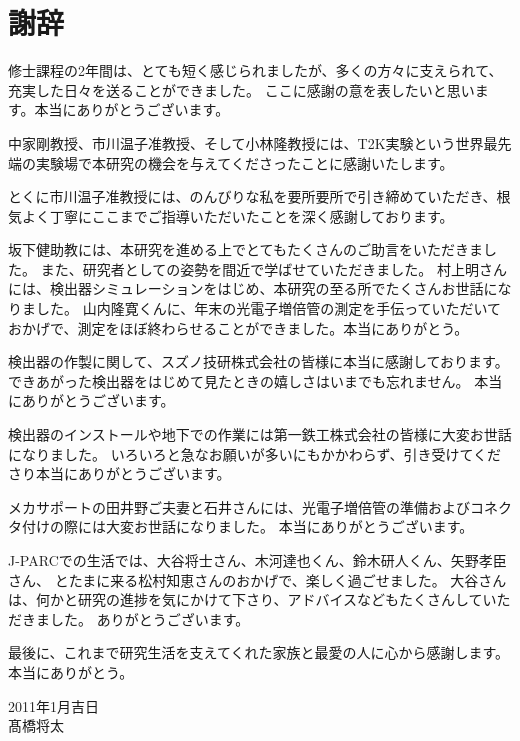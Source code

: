 \chapter*{謝辞}

修士課程の2年間は、とても短く感じられましたが、多くの方々に支えられて、充実した日々を送ることができました。
ここに感謝の意を表したいと思います。本当にありがとうございます。

中家剛教授、市川温子准教授、そして小林隆教授には、T2K実験という世界最先端の実験場で本研究の機会を与えてくださったことに感謝いたします。

とくに市川温子准教授には、のんびりな私を要所要所で引き締めていただき、根気よく丁寧にここまでご指導いただいたことを深く感謝しております。

坂下健助教には、本研究を進める上でとてもたくさんのご助言をいただきました。
また、研究者としての姿勢を間近で学ばせていただきました。
村上明さんには、検出器シミュレーションをはじめ、本研究の至る所でたくさんお世話になりました。
山内隆寛くんに、年末の光電子増倍管の測定を手伝っていただいておかげで、測定をほぼ終わらせることができました。本当にありがとう。

検出器の作製に関して、スズノ技研株式会社の皆様に本当に感謝しております。
できあがった検出器をはじめて見たときの嬉しさはいまでも忘れません。
本当にありがとうございます。

検出器のインストールや地下での作業には第一鉄工株式会社の皆様に大変お世話になりました。
いろいろと急なお願いが多いにもかかわらず、引き受けてくださり本当にありがとうございます。

メカサポートの田井野ご夫妻と石井さんには、光電子増倍管の準備およびコネクタ付けの際には大変お世話になりました。
本当にありがとうございます。


J-PARCでの生活では、大谷将士さん、木河達也くん、鈴木研人くん、矢野孝臣さん、
とたまに来る松村知恵さんのおかげで、楽しく過ごせました。
大谷さんは、何かと研究の進捗を気にかけて下さり、アドバイスなどもたくさんしていただきました。
ありがとうございます。\newline

最後に、これまで研究生活を支えてくれた家族と最愛の人に心から感謝します。本当にありがとう。\newline

\begin{flushright}
2011年1月吉日\\
髙橋将太
\end{flushright}